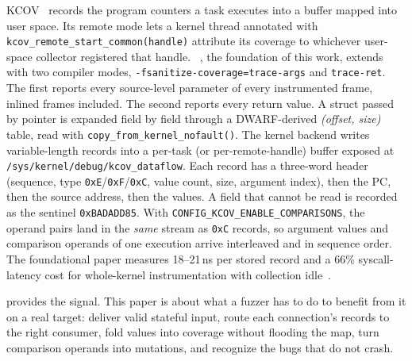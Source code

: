 \documentclass{article}
\begin{document}
KCOV~\cite{vyukov2016kcov} records the program counters a task executes into a
buffer mapped into user space. Its remote mode lets a kernel thread annotated
with \texttt{kcov\_remote\_start\_common(handle)} attribute its coverage to
whichever user-space collector registered that handle. \kcovdf~\cite{kim2026kcovdataflow},
the foundation of this work, extends \sancov with two compiler modes,
\texttt{-fsanitize-coverage=trace-args} and \texttt{trace-ret}. The first
reports every source-level parameter of every instrumented frame, inlined
frames included. The second reports every return value. A struct passed by
pointer is expanded field by field through a DWARF-derived
\emph{(offset, size)} table, read with \texttt{copy\_from\_kernel\_nofault()}.
The kernel backend writes variable-length records into a per-task (or
per-remote-handle) buffer exposed at \texttt{/sys/kernel/debug/kcov\_dataflow}.
Each record has a three-word header (sequence, type \texttt{0xE}/\texttt{0xF}/\texttt{0xC},
value count, size, argument index), then the PC, then the source address, then
the values. A field that cannot be read is recorded as the sentinel
\texttt{0xBADADD85}. With \texttt{CONFIG\_KCOV\_ENABLE\_COMPARISONS}, the
\tracecmp operand pairs land in the \emph{same} stream as \texttt{0xC}
records, so argument values and comparison operands of one execution arrive
interleaved and in sequence order. The foundational paper measures
18--21\,ns per stored record and a 66\% syscall-latency cost for whole-kernel
instrumentation with collection idle~\cite{kim2026kcovdataflow}.

\kcovdf provides the signal. This paper is about what a fuzzer has to do to
benefit from it on a real target: deliver valid stateful input, route each
connection's records to the right consumer, fold values into coverage without
flooding the map, turn comparison operands into mutations, and recognize the
bugs that do not crash.
\end{document}
